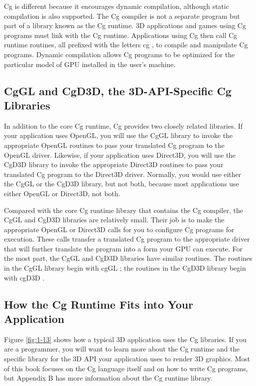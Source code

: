 \documentclass{book}
\begin{document}
Cg is different because it encourages dynamic compilation, although static compilation is also supported. The Cg compiler is not a separate program but part of a library known as the Cg runtime. 3D applications and games using Cg programs must link with the Cg runtime. Applications using Cg then call Cg runtime routines, all prefixed with the letters cg , to compile and manipulate Cg programs. Dynamic compilation allows Cg programs to be optimized for the particular model of GPU installed in the user's machine.

\subsection*{CgGL and CgD3D, the 3D-API-Specific Cg Libraries}

In addition to the core Cg runtime, Cg provides two closely related libraries. If your application uses OpenGL, you will use the CgGL library to invoke the appropriate OpenGL routines to pass your translated Cg program to the OpenGL driver. Likewise, if your application uses Direct3D, you will use the CgD3D library to invoke the appropriate Direct3D routines to pass your translated Cg program to the Direct3D driver. Normally, you would use either the CgGL or the CgD3D library, but not both, because most applications use either OpenGL or Direct3D, not both.

Compared with the core Cg runtime library that contains the Cg compiler, the CgGL and CgD3D libraries are relatively small. Their job is to make the appropriate OpenGL or Direct3D calls for you to configure Cg programs for execution. These calls transfer a translated Cg program to the appropriate driver that will further translate the program into a form your GPU can execute. For the most part, the CgGL and CgD3D libraries have similar routines. The routines in the CgGL library begin with cgGL ; the routines in the CgD3D library begin with cgD3D .

\subsection*{How the Cg Runtime Fits into Your Application}

Figure \ref{fig:1-13} shows how a typical 3D application uses the Cg libraries. If you are a programmer, you will want to learn more about the Cg runtime and the specific library for the 3D API your application uses to render 3D graphics. Most of this book focuses on the Cg language itself and on how to write Cg programs, but Appendix B has more information about the Cg runtime library.
\end{document}
